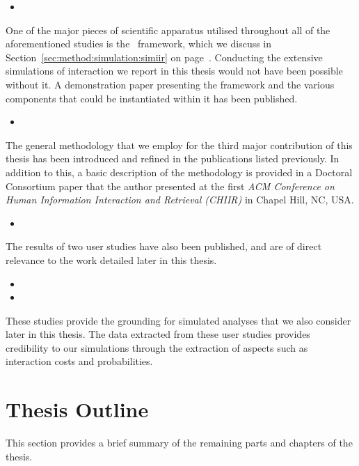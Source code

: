 \begin{itemize}
    \item{}
\end{itemize}

\noindent
{}
One of the major pieces of scientific apparatus utilised throughout all of the aforementioned studies is the \simiir~framework, which we discuss in Section~\ref{sec:method:simulation:simiir} on page~\pageref{sec:method:simulation:simiir}. Conducting the extensive simulations of interaction we report in this thesis would not have been possible without it. A demonstration paper presenting the framework and the various components that could be instantiated within it has been published.

\begin{itemize}
    \item{}
\end{itemize}

\noindent
{}
The general methodology that we employ for the third major contribution of this thesis has been introduced and refined in the publications listed previously. In addition to this, a basic description of the methodology is provided in a Doctoral Consortium paper that the author presented at the first \emph{ACM Conference on Human Information Interaction and Retrieval (CHIIR)} in Chapel Hill, NC, USA.

\begin{itemize}
    \item{}
\end{itemize}

The results of two user studies have also been published, and are of direct relevance to the work detailed later in this thesis.

\begin{itemize}
    \item{}
    \item{}
\end{itemize}

These studies provide the grounding for simulated analyses that we also consider later in this thesis. The data extracted from these user studies provides credibility to our simulations through the extraction of aspects such as interaction costs and probabilities.

\section{Thesis Outline}
This section provides a brief summary of the remaining parts and chapters of the thesis.

